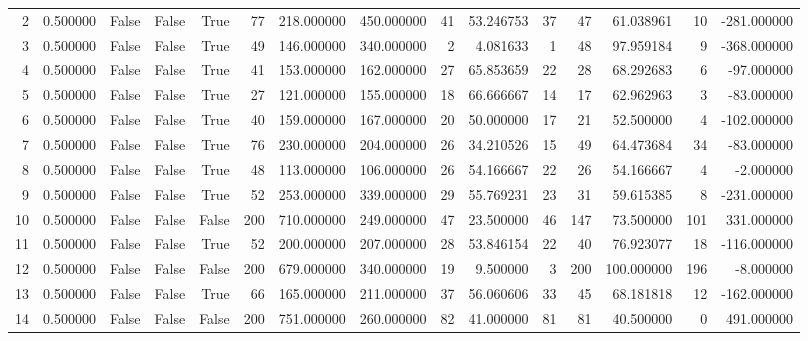\begin{table}[htbp]
\begin{tabular}{rrrrrrrrrrrrrrr}
2 & 0.500000 & False & False & True & 77 & 218.000000 & 450.000000 & 41 & 53.246753 & 37 & 47 & 61.038961 & 10 & -281.000000 \\
3 & 0.500000 & False & False & True & 49 & 146.000000 & 340.000000 & 2 & 4.081633 & 1 & 48 & 97.959184 & 9 & -368.000000 \\
4 & 0.500000 & False & False & True & 41 & 153.000000 & 162.000000 & 27 & 65.853659 & 22 & 28 & 68.292683 & 6 & -97.000000 \\
5 & 0.500000 & False & False & True & 27 & 121.000000 & 155.000000 & 18 & 66.666667 & 14 & 17 & 62.962963 & 3 & -83.000000 \\
6 & 0.500000 & False & False & True & 40 & 159.000000 & 167.000000 & 20 & 50.000000 & 17 & 21 & 52.500000 & 4 & -102.000000 \\
7 & 0.500000 & False & False & True & 76 & 230.000000 & 204.000000 & 26 & 34.210526 & 15 & 49 & 64.473684 & 34 & -83.000000 \\
8 & 0.500000 & False & False & True & 48 & 113.000000 & 106.000000 & 26 & 54.166667 & 22 & 26 & 54.166667 & 4 & -2.000000 \\
9 & 0.500000 & False & False & True & 52 & 253.000000 & 339.000000 & 29 & 55.769231 & 23 & 31 & 59.615385 & 8 & -231.000000 \\
10 & 0.500000 & False & False & False & 200 & 710.000000 & 249.000000 & 47 & 23.500000 & 46 & 147 & 73.500000 & 101 & 331.000000 \\
11 & 0.500000 & False & False & True & 52 & 200.000000 & 207.000000 & 28 & 53.846154 & 22 & 40 & 76.923077 & 18 & -116.000000 \\
12 & 0.500000 & False & False & False & 200 & 679.000000 & 340.000000 & 19 & 9.500000 & 3 & 200 & 100.000000 & 196 & -8.000000 \\
13 & 0.500000 & False & False & True & 66 & 165.000000 & 211.000000 & 37 & 56.060606 & 33 & 45 & 68.181818 & 12 & -162.000000 \\
14 & 0.500000 & False & False & False & 200 & 751.000000 & 260.000000 & 82 & 41.000000 & 81 & 81 & 40.500000 & 0 & 491.000000 \\
\bottomrule
\end{tabular}

\end{table}
